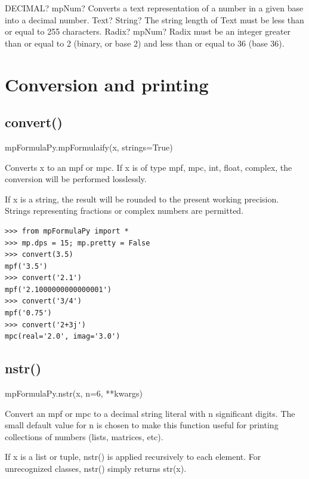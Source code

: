 \vspace{0.6cm}
\begin{mpFunctionsExtract}
	\mpWorksheetFunctionTwoNotImplemented
	{DECIMAL? mpNum? Converts a text representation of a number in a given base into a decimal number.}
	{Text? String? The string length of Text must be less than or equal to 255 characters.}
	{Radix? mpNum? Radix must be an integer greater than or equal to 2 (binary, or base 2) and less than or equal to 36 (base 36).}
\end{mpFunctionsExtract}






\newpage
\section{Conversion and printing}

\subsection{convert()}

mpFormulaPy.mpFormulaify(x, strings=True)

\vpara
Converts x to an mpf or mpc. If x is of type mpf, mpc, int, float, complex, the conversion will be performed losslessly.

\vpara
If x is a string, the result will be rounded to the present working precision. Strings representing fractions or complex numbers are permitted.

\begin{lstlisting}
>>> from mpFormulaPy import *
>>> mp.dps = 15; mp.pretty = False
>>> convert(3.5)
mpf('3.5')
>>> convert('2.1')
mpf('2.1000000000000001')
>>> convert('3/4')
mpf('0.75')
>>> convert('2+3j')
mpc(real='2.0', imag='3.0')
\end{lstlisting}


\subsection{nstr()}

mpFormulaPy.nstr(x, n=6, **kwargs)

\vpara
Convert an mpf or mpc to a decimal string literal with n significant digits. The small default value for n is chosen to make this function useful for printing collections of numbers (lists, matrices, etc).

\vpara
If x is a list or tuple, nstr() is applied recursively to each element. For unrecognized classes, nstr() simply returns str(x).

